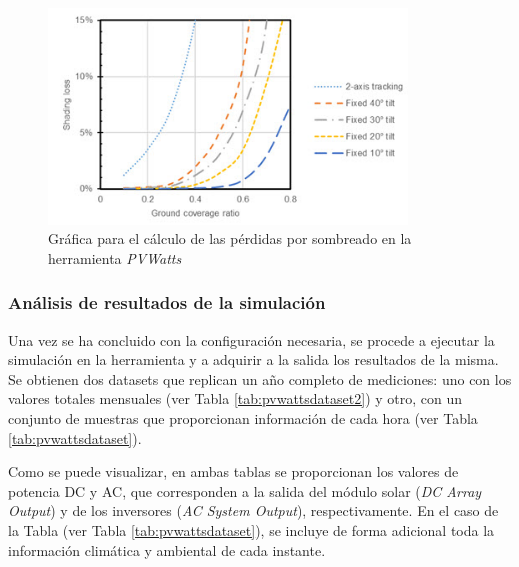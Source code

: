 \begin{figure}[H]
    \centering
    \includegraphics[width=0.85\textwidth]{img/diseno/sombra.png}
    \caption{Gráfica para el cálculo de las pérdidas por sombreado en la herramienta \textit{PVWatts}~\cite{pvwatts}}
    \label{fig:sombra}
\end{figure}

\subsubsection{Análisis de resultados de la simulación}
\label{sec:resultadossimu}

Una vez se ha concluido con la configuración necesaria, se procede a ejecutar la simulación en la herramienta y a adquirir a la salida los resultados de la misma. Se obtienen dos datasets que replican un año completo de mediciones: uno con los valores totales mensuales (ver Tabla \ref{tab:pvwattsdataset2}) y otro, con un conjunto de muestras que proporcionan información de cada hora (ver Tabla \ref{tab:pvwattsdataset}). 

\vspace{3mm}

Como se puede visualizar, en ambas tablas se proporcionan los valores de potencia DC y AC, que corresponden a la salida del módulo solar (\textit{DC Array Output}) y de los inversores (\textit{AC System Output}), respectivamente. En el caso de la Tabla (ver Tabla \ref{tab:pvwattsdataset}), se incluye de forma adicional toda la información climática y ambiental de cada instante.

\vspace{3mm}

